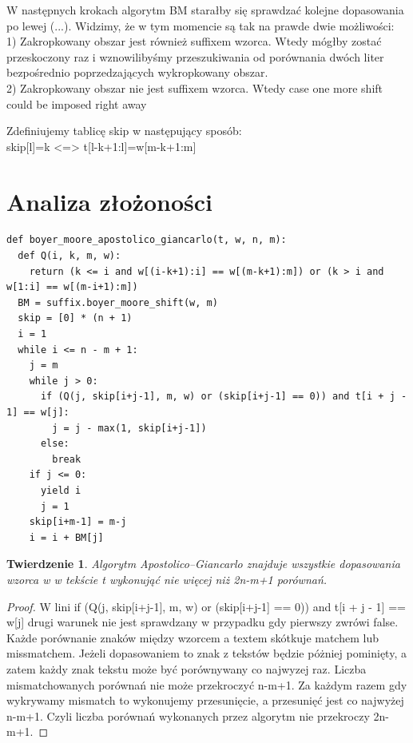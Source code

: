 \documentclass[12pt]{article}
\theoremstyle{plain}
\newtheorem*{theorem-thm*}{Twierdzenie}
\begin{document}
W następnych krokach algorytm BM starałby się sprawdzać kolejne dopasowania po lewej (...). Widzimy, że w tym momencie są tak na prawde dwie możliwości:\\
1) Zakropkowany obszar jest również suffixem wzorca. Wtedy mógłby zostać przeskoczony raz i wznowilibyśmy przeszukiwania od porównania dwóch liter bezpośrednio poprzedzających wykropkowany obszar.\\
2) Zakropkowany obszar nie jest suffixem wzorca. Wtedy
case one more shift could be imposed right away

Zdefiniujemy tablicę skip w następujący sposób:\\
skip[l]=k <=> t[l-k+1:l]=w[m-k+1:m]

\section*{Analiza złożoności}

\begin{lstlisting}
def boyer_moore_apostolico_giancarlo(t, w, n, m):
  def Q(i, k, m, w):
    return (k <= i and w[(i-k+1):i] == w[(m-k+1):m]) or (k > i and w[1:i] == w[(m-i+1):m])
  BM = suffix.boyer_moore_shift(w, m)
  skip = [0] * (n + 1)
  i = 1
  while i <= n - m + 1:
    j = m
    while j > 0:
      if (Q(j, skip[i+j-1], m, w) or (skip[i+j-1] == 0)) and t[i + j - 1] == w[j]:
        j = j - max(1, skip[i+j-1])
      else:
        break
    if j <= 0:
      yield i
      j = 1
    skip[i+m-1] = m-j
    i = i + BM[j]
\end{lstlisting}

\begin{theorem-thm*}
	Algorytm Apostolico–Giancarlo znajduje wszystkie dopasowania wzorca w w tekście t wykonująć nie więcej niż 2n-m+1 porównań.
\end{theorem-thm*}

\begin{proof}
	W lini if (Q(j, skip[i+j-1], m, w) or (skip[i+j-1] == 0)) and t[i + j - 1] == w[j] drugi warunek nie jest sprawdzany w przypadku gdy pierwszy zwrówi false. Każde porównanie znaków między wzorcem a textem skótkuje matchem lub missmatchem. Jeżeli dopasowaniem to znak z tekstów będzie póżniej pominięty, a zatem każdy znak tekstu może być porównywany co najwyzej raz. Liczba mismatchowanych porównań nie może przekroczyć n-m+1. Za każdym razem gdy wykrywamy mismatch to wykonujemy przesunięcie, a przesunięć jest co najwyżej n-m+1. Czyli liczba porównań wykonanych przez algorytm nie przekroczy 2n-m+1.
\end{proof}
\end{document}
